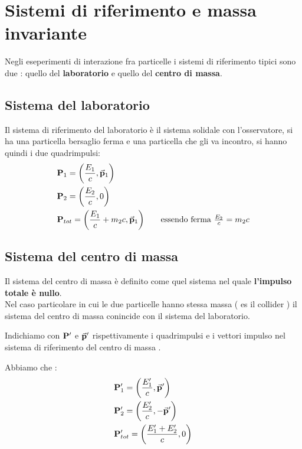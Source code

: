 \chapter{Sistemi di riferimento e massa invariante}
Negli eseperimenti di interazione fra particelle i sistemi di riferimento tipici sono due : quello del \textbf{laboratorio} e quello del \textbf{centro di massa}.
\section{Sistema del laboratorio}
Il sistema di riferimento del laboratorio è il sistema solidale con l'osservatore, si ha una particella bersaglio ferma e una particella che gli va incontro, si hanno 
quindi i due quadrimpulsi: 
\begin{align*}
        &\vb{P}_1 = \qty(\frac{E_1}{c},\va{p}_1) \\
        &\vb{P}_2 = \qty(\frac{E_2}{c}, 0) \\
        &\vb{P}_{tot} = \qty(\frac{E_1}{c} + m_2c, \va{p}_1) \tag*{essendo ferma $ \frac{E_2}{c} = m_2c $}
\end{align*}
\section{Sistema del centro di massa}
Il sistema del centro di massa è definito come quel sistema nel quale \textbf{l'impulso totale è nullo}.\\
Nel caso particolare in cui le due particelle hanno stessa massa ( es il collider ) il sistema del centro di massa conincide con il sistema del laboratorio. \\
\begin{tcolorbox}[colback=red!5!white,colframe=red!50!black,title=ATTENZIONE !]
        Indichiamo con $\vb{P}^{\prime}$ e $\va{p}^{\prime}$ rispettivamente i quadrimpulsi e i vettori impulso nel sistema di riferimento del centro di massa .
\end{tcolorbox}
\newpage
Abbiamo che : 
\begin{align*}
    &\vb{P}^{\prime}_1 = \qty(\frac{E^{\prime}_1}{c}, \va{p}^{\prime}) \\
    &\vb{P}^{\prime}_2 = \qty(\frac{E^{\prime}_2}{c}, -\va{p}^{\prime}) \\
    &\vb{P}^{\prime}_{tot} = \qty(\frac{E^{\prime}_1 +  E^{\prime}_2}{c}, 0) \end{align*}
